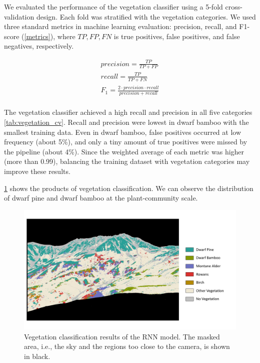 \documentclass{article}
\begin{document}
We evaluated the performance of the vegetation classifier using a 5-fold cross-validation design. Each fold was stratified with the vegetation categories. We used three standard metrics in machine learning evaluation: precision, recall, and F1-score (\ref{metrics}), where \(TP, FP, FN\) is true positives, false positives, and false negatives, respectively.

\label{metrics}
\begin{align}
  precision = \frac{TP}{TP + FP} \\
  recall = \frac{TP}{TP + FN} \\
  F_1 = \frac{2 \cdot precision \cdot recall}{precision + recall} \\
\end{align}

The vegetation classifier achieved a high recall and precision in all five categories \ref{tab:vegetation_cv}. Recall and precision were lowest in dwarf bamboo with the smallest training data. Even in dwarf bamboo, false positives occurred at low frequency (about 5\%), and only a tiny amount of true positives were missed by the pipeline (about 4\%). Since the weighted average of each metric was higher (more than 0.99), balancing the training dataset with vegetation categories may improve these results.

\ref{fig:vegetation} shows the products of vegetation classification. We can observe the distribution of dwarf pine and dwarf bamboo at the plant-community scale.



\begin{figure}
\includegraphics[width=1\linewidth]{paper_files/figures/Slide2} \caption{Vegetation classification results of the RNN model. The masked area, i.e., the sky and the regions too close to the camera, is shown in black.}\label{fig:vegetation}
\end{figure}
\end{document}

